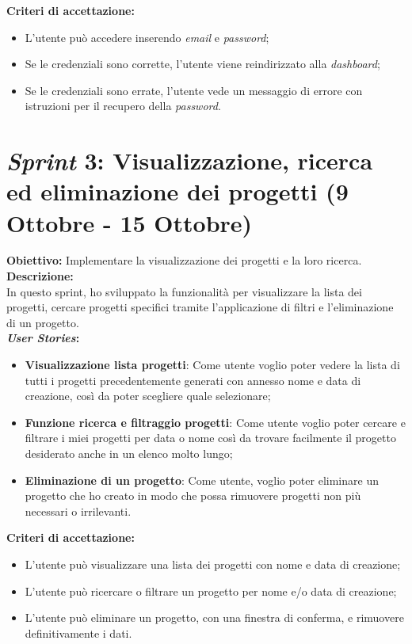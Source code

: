 \noindent \textbf{Criteri di accettazione:}  
\begin{itemize}
    \item L'utente può accedere inserendo \textit{email} e \textit{password};
    \item Se le credenziali sono corrette, l'utente viene reindirizzato alla \textit{dashboard};
    \item Se le credenziali sono errate, l'utente vede un messaggio di errore con istruzioni per il recupero della \textit{password}.
\end{itemize}

\pagebreak
\section*{\textit{Sprint} 3: Visualizzazione, ricerca ed eliminazione dei progetti (9 Ottobre - 15 Ottobre)}
\noindent \textbf{Obiettivo:} Implementare la visualizzazione dei progetti e la loro ricerca.\\

\noindent \textbf{Descrizione:}\\  
\noindent In questo \gls{sprint}, ho sviluppato la funzionalità per visualizzare la lista dei progetti, cercare progetti specifici tramite l’applicazione di filtri e l’eliminazione di un progetto.\\  

\noindent \textbf{\textit{User Stories}:}  
\begin{itemize}
    \item \textbf{Visualizzazione lista progetti}: Come utente voglio poter vedere la lista di tutti i progetti precedentemente generati con annesso nome e data di creazione, così da poter scegliere quale selezionare;
    \item \textbf{Funzione ricerca e filtraggio progetti}: Come utente voglio poter cercare e filtrare i miei progetti per data o nome così da trovare facilmente il progetto desiderato anche in un elenco molto lungo;
    \item \textbf{Eliminazione di un progetto}: Come utente, voglio poter eliminare un progetto che ho creato in modo che possa rimuovere progetti non più necessari o irrilevanti.
\end{itemize}

\noindent \textbf{Criteri di accettazione:}  
\begin{itemize}
    \item L'utente può visualizzare una lista dei progetti con nome e data di creazione;
    \item L'utente può ricercare o filtrare un progetto per nome e/o data di creazione;
    \item L'utente può eliminare un progetto, con una finestra di conferma, e rimuovere definitivamente i dati.
\end{itemize}

